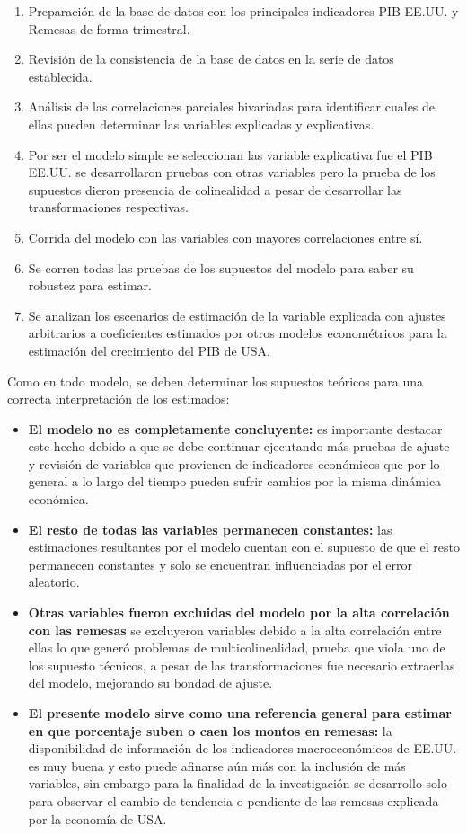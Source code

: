 \begin{enumerate}
	\item Preparación de la base de datos con los principales indicadores PIB EE.UU. y Remesas de forma trimestral.
	\item Revisión de la consistencia de la base de datos en la serie de datos establecida.
	\item Análisis de las correlaciones parciales bivariadas para identificar cuales de ellas pueden determinar las variables explicadas y explicativas.
	\item Por ser el modelo simple se seleccionan las variable explicativa fue el PIB EE.UU. se desarrollaron pruebas con otras variables pero la prueba de los supuestos dieron presencia de colinealidad a pesar de desarrollar las transformaciones respectivas.
	\item Corrida del modelo con las variables con mayores correlaciones entre sí.
	\item Se corren todas las pruebas de los supuestos del modelo para saber su robustez para estimar.
	\item Se analizan los escenarios de estimación de la variable explicada con ajustes arbitrarios a coeficientes estimados por otros modelos econométricos para la estimación del crecimiento del PIB de USA.	
	
\end{enumerate}

Como en todo modelo, se deben determinar los supuestos teóricos para una correcta interpretación de los estimados:	


\begin{itemize}
	\item \textbf{El modelo no es completamente concluyente:} es importante destacar este hecho debido a que se debe continuar ejecutando más pruebas de ajuste y revisión de variables que provienen de indicadores económicos que por lo general a lo largo del tiempo pueden sufrir cambios por la misma dinámica económica. 
	\item \textbf{El resto de todas las variables permanecen constantes:} las estimaciones resultantes por el modelo cuentan con el supuesto de que el resto permanecen constantes y solo se encuentran influenciadas por el error aleatorio.
	\item \textbf{Otras variables fueron excluidas del modelo por la alta correlación con las remesas} se excluyeron variables debido a la alta correlación entre ellas lo que generó problemas de multicolinealidad, prueba que viola uno de los supuesto técnicos, a pesar de las transformaciones fue necesario extraerlas del modelo, mejorando su bondad de ajuste.
	\item \textbf{El presente modelo sirve como una referencia general para estimar en que porcentaje suben o caen los montos en remesas:} la disponibilidad de información de los indicadores macroeconómicos de EE.UU. es muy buena y esto puede afinarse aún más con la inclusión de más variables, sin embargo para la finalidad de la investigación se desarrollo solo para observar el cambio de tendencia o pendiente de las remesas explicada por la economía de USA. 
	
\end{itemize}


